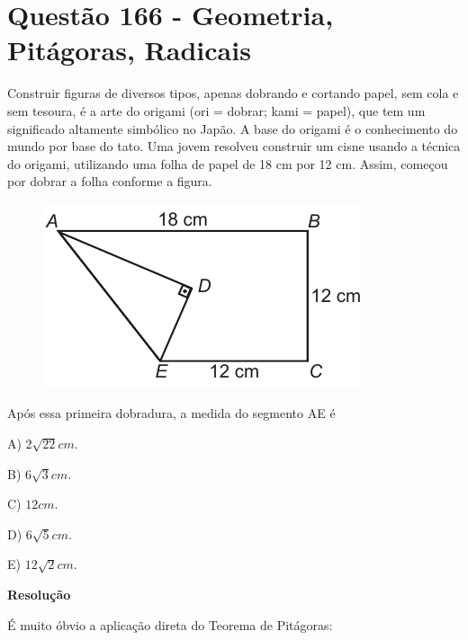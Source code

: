 \section{Questão 166 - Geometria, Pitágoras, Radicais}

Construir figuras de diversos tipos, apenas dobrando e cortando papel, sem cola e sem tesoura, é a arte do origami (ori = dobrar; kami = papel), que tem um significado altamente simbólico no Japão. A base do origami é o conhecimento do mundo por base do tato. Uma jovem resolveu construir um cisne usando a técnica do origami, utilizando uma folha de papel de 18 cm por 12 cm. Assim, começou por dobrar a folha conforme a figura.

\begin{figure}[H]
    \centering
    \includegraphics[width=0.95\linewidth]{Q166.pdf}
    \label{fig:q166}
\end{figure}

Após essa primeira dobradura, a medida do segmento AE é

A) $ 2\sqrt{22} cm $.

B) $ 6\sqrt{3} cm $.

C) $ 12 cm $.

D) $ 6\sqrt{5} cm $.

E) $ 12\sqrt{2} cm $.

\textbf{Resolução}

É muito óbvio a aplicação direta do Teorema de Pitágoras:




